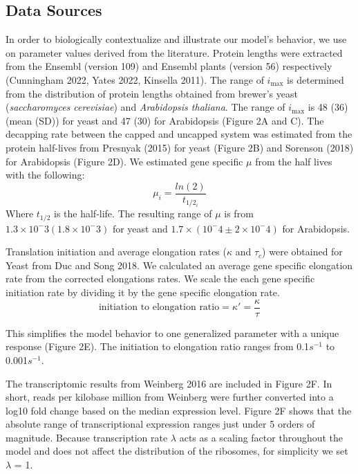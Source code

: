 \documentclass[review]{elsarticle}
\newcommand{\imax}{\ensuremath{{i_{\max}}}\xspace}
\begin{document}
\subsection{Data Sources}

In order to biologically contextualize and illustrate our model's behavior, we use on parameter values derived from the literature.
Protein lengths were extracted from the Ensembl (version 109) and Ensembl plants (version 56) respectively (Cunningham 2022, Yates 2022, Kinsella 2011).  
The range of \imax is determined from the distribution of protein lengths obtained from brewer's yeast (\textit{saccharomyces cerevisiae}) and \textit{Arabidopsis thaliana}. The range of \imax is  48 (36) (mean (SD)) for yeast and 47 (30) for Arabidopsis (Figure 2A and C).
The decapping rate between the capped and uncapped system was estimated from the protein half-lives from Presnyak (2015) for yeast (Figure 2B) and Sorenson (2018) for Arabidopsis (Figure 2D).
We estimated gene specific $\mu$ from the half lives with the following:
	\begin{equation*}
		\mu_i = \frac{ln(2)}{t_{1/2_i}}
	\end{equation*}
Where $t_{1/2}$ is the half-life. The resulting range of $\mu$ is from $1.3 \times 10^-3 (1.8 \times 10^-3)$ for yeast and $1.7 \times (10^-4 \pm 2 \times 10^-4)$ for Arabidopsis. 

Translation initiation and average elongation rates ($\kappa$ and $\tau_c$) were obtained for Yeast from Duc and Song 2018. 
We calculated an average gene specific elongation rate from the corrected elongations rates. We scale the each gene specific initiation rate by dividing it by the gene specific elongation rate.
\begin{equation}
	\text{initiation to elongation ratio} = \kappa' = \frac{\kappa}{\tau}
\end{equation}

This simplifies the model behavior to one generalized parameter with a unique response (Figure 2E).  The initiation to elongation ratio ranges from 0.1$s^{-1}$ to 0.001$s^{-1}$.

The transcriptomic results from Weinberg 2016 are included in Figure 2F. In short, reads per kilobase million from Weinberg were further converted into a log10 fold change based on the median expression level. Figure 2F shows that the absolute range of transcriptional expression ranges just under 5 orders of magnitude. Because transcription rate $\lambda$ acts as a scaling factor throughout the model and does not affect the distribution of the ribosomes, for simplicity we set $\lambda$ = 1.
\end{document}

